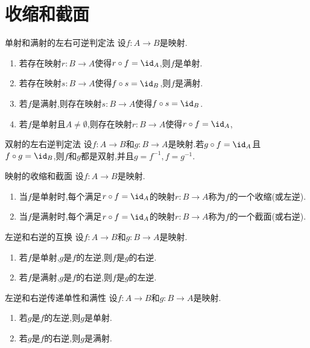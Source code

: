 \section{收缩和截面}

\begin{proposition}{单射和满射的左右可逆判定法}{}
	设$f:A\to B$是映射.
	\begin{enumerate}
		\item 若存在映射$r:B\to A$使得$r\circ f=\id_{A}$,则$f$是单射.
		\item 若存在映射$s:B\to A$使得$f\circ s=\id_{B}$,则$f$是满射.
		\item 若$f$是满射,则存在映射$s:B\to A$使得$f\circ s=\id_{B}$.
		\item 若$f$是单射且$A\neq\emptyset$,则存在映射$r:B\to A$使得$r\circ f=\id_{A}$,
	\end{enumerate}
\end{proposition}

\begin{corollary}{双射的左右逆判定法}{}
	设$f:A\to B$和$g:B\to A$是映射.若$g\circ f=\id_{A}$且$f\circ g=\id_{B}$,则$f$和$g$都是双射,并且$g=f^{-1},f=g^{-1}$.
\end{corollary}

\begin{definition}{映射的收缩和截面}{}
	设$f:A\to B$是映射.
	\begin{enumerate}
		\item 当$f$是单射时,每个满足$r\circ f=\id_{A}$的映射$r:B\to A$称为$f$的一个收缩(或左逆).
		\item 当$f$是满射时,每个满足$r\circ f=\id_{A}$的映射$r:B\to A$称为$f$的一个截面(或右逆).
	\end{enumerate}
\end{definition}

\begin{proposition}{左逆和右逆的互换}{}
	设$f:A\to B$和$g:B\to A$是映射.
	\begin{enumerate}
		\item 若$f$是单射,$g$是$f$的左逆,则$f$是$g$的右逆.
		\item 若$f$是满射,$g$是$f$的右逆,则$f$是$g$的左逆.
	\end{enumerate}
\end{proposition}

\begin{proposition}{左逆和右逆传递单性和满性}{}
	设$f:A\to B$和$g:B\to A$是映射.
	\begin{enumerate}
		\item 若$g$是$f$的左逆,则$g$是单射.
		\item 若$g$是$f$的右逆,则$g$是满射.
	\end{enumerate}
\end{proposition}

